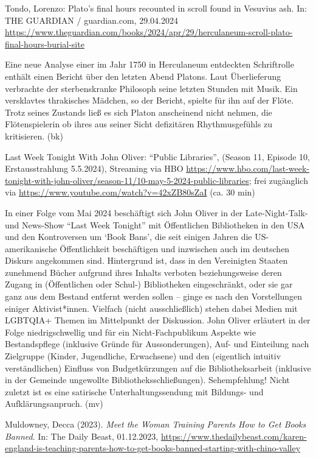 \documentclass[a4paper,
fontsize=11pt,
oneside,
numbers=noperiodatend,
parskip=half-,
bibliography=totoc,
final
]{scrartcl}
\begin{document}
Tondo, Lorenzo: Plato's final hours recounted in scroll found in
Vesuvius ash. In: THE GUARDIAN / guardian.com, 29.04.2024
\url{https://www.theguardian.com/books/2024/apr/29/herculaneum-scroll-plato-final-hours-burial-site}

Eine neue Analyse einer im Jahr 1750 in Herculaneum entdeckten
Schriftrolle enthält einen Bericht über den letzten Abend Platons. Laut
Überlieferung verbrachte der sterbenskranke Philosoph seine letzten
Stunden mit Musik. Ein versklavtes thrakisches Mädchen, so der Bericht,
spielte für ihn auf der Flöte. Trotz seines Zustands ließ es sich Platon
anscheinend nicht nehmen, die Flötenspielerin ob ihres aus seiner Sicht
defizitären Rhythmusgefühls zu kritisieren. (bk)

Last Week Tonight With John Oliver: \enquote{Public Libraries}, (Season
11, Episode 10, Erstausstrahlung 5.5.2024), Streaming via HBO
\url{https://www.hbo.com/last-week-tonight-with-john-oliver/season-11/10-may-5-2024-public-libraries};
frei zugänglich via \url{https://www.youtube.com/watch?v=42xZB80sZaI}
(ca. 30 min)

In einer Folge vom Mai 2024 beschäftigt sich John Oliver in der
Late-Night-Talk- und News-Show \enquote{Last Week Tonight} mit
Öffentlichen Bibliotheken in den USA und den Kontroversen um
\enquote*{Book Bans}, die seit einigen Jahren die US-amerikanische
Öffentlichkeit beschäftigen und inzwischen auch im deutschen Diskurs
angekommen sind. Hintergrund ist, dass in den Vereinigten Staaten
zunehmend Bücher aufgrund ihres Inhalts verboten beziehungsweise deren
Zugang in (Öffentlichen oder Schul-) Bibliotheken eingeschränkt, oder
sie gar ganz aus dem Bestand entfernt werden sollen -- ginge es nach den
Vorstellungen einiger Aktivist*innen. Vielfach (nicht ausschließlich)
stehen dabei Medien mit LGBTQIA+ Themen im Mittelpunkt der Diskussion.
John Oliver erläutert in der Folge niedrigschwellig und für ein
Nicht-Fachpublikum Aspekte wie Bestandspflege (inklusive Gründe für
Aussonderungen), Auf- und Einteilung nach Zielgruppe (Kinder,
Jugendliche, Erwachsene) und den (eigentlich intuitiv verständlichen)
Einfluss von Budgetkürzungen auf die Bibliotheksarbeit (inklusive in der
Gemeinde ungewollte Bibliotheksschließungen). Sehempfehlung! Nicht
zuletzt ist es eine satirische Unterhaltungssendung mit Bildungs- und
Aufklärungsanpruch. (mv)

Muldowney, Decca (2023). \emph{Meet the Woman Training Parents How to
Get Books Banned}. In: The Daily Beast, 01.12.2023,
\url{https://www.thedailybeast.com/karen-england-is-teaching-parents-how-to-get-books-banned-starting-with-chino-valley}
\end{document}
